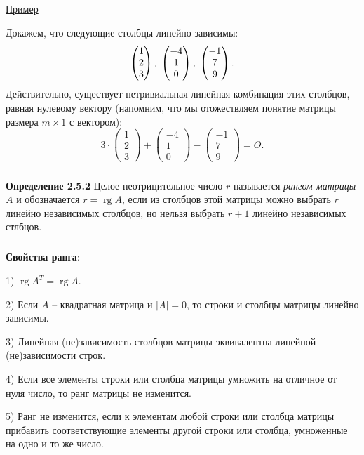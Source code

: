 \documentclass[12pt,a4paper]{article}
\DeclareMathOperator{\rg}{rg}
\begin{document}
\subparagraph{}
\underline{Пример}

Докажем, что следующие столбцы линейно зависимы:
\[
\begin{pmatrix}
1 \\
2 \\
3 
\end{pmatrix}, \hspace{3px} \begin{pmatrix}
-4 \\
1 \\
0 
\end{pmatrix}, \hspace{3px} \begin{pmatrix}
-1 \\
7 \\
9 
\end{pmatrix}.
\]
Действительно, существует нетривиальная линейная комбинация этих столбцов, равная нулевому вектору (напомним, что мы отожествляем понятие матрицы размера $m \times 1$ с вектором):
\[
3 \cdot \begin{pmatrix}
1 \\
2 \\
3 
\end{pmatrix} + \begin{pmatrix}
-4 \\
1 \\
0 
\end{pmatrix} - \begin{pmatrix}
-1 \\
7 \\
9 
\end{pmatrix} = O.
\]

\subparagraph{}
\textbf{Определение 2.5.2} 
Целое неотрицительное число $r$ называется \textit{рангом матрицы} $A$ и обозначается $r = \rg A$, если из столбцов этой матрицы можно выбрать $r$ линейно независимых столбцов, но нельзя выбрать $r + 1$ линейно независимых стлбцов. 

\subparagraph{}
\textbf{Свойства ранга}:

1) $\rg A^T = \rg A$.

2) Если $A$ -- квадратная матрица и $|A| = 0$, то строки и столбцы матрицы линейно зависимы.

3) Линейная (не)зависимость столбцов матрицы эквивалентна линейной (не)зависимости строк.

4) Если все элементы строки или столбца матрицы умножить на отличное от нуля число, то ранг матрицы не изменится.

5) Ранг не изменится, если к элементам любой строки или столбца матрицы прибавить соответствующие элементы другой строки или столбца, умноженные на одно и то же число.
\end{document}
